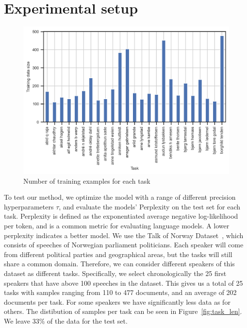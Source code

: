 \documentclass{article}
\begin{document}
\section{Experimental setup}
\begin{figure}[h] \label{fig:task_len}
    \centering
    \includegraphics[width=\textwidth]{figures/training_lengths.png}
    \caption{Number of training examples for each task}
   \label{fig:training_lengths}
\end{figure}
To test our method, we optimize the model with a range of different precision hyperparameters $\tau$, and evaluate the models' Perplexity on the test set for each task.
Perplexity is defined as the exponentiated average negative log-likelihood per token, and is a common metric for evaluating language models. A lower perplexity indicates a better model.
We use the Talk of Norway Dataset~\cite{lapponi_talk_2018}, which consists of speeches of Norwegian parliament politicians.
Each speaker will come from different political parties and geographical areas, but the tasks will still share a common domain. 
Therefore, we can consider different speakers of this dataset as different tasks. Specifically, we select chronologically the 25 first speakers that have above 100 speeches in the dataset.
This gives us a total of 25 tasks with samples ranging from 110 to 477 documents, and an average of 202 documents per task. For some speakers we have significantly less data as for others. 
The distibution of samples per task can be seen in Figure~\ref{fig:task_len}.
We leave 33\% of the data for the test set.
\end{document}
